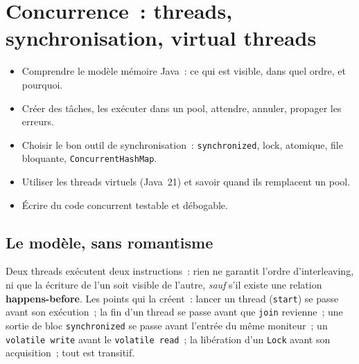 \chapter{Concurrence~: threads, synchronisation, virtual threads}
\label{ch-java-concurrency}

\begin{objectif}
\begin{itemize}
  \item Comprendre le mod\`ele m\'emoire Java~: ce qui est visible, dans quel ordre, et pourquoi.
  \item Cr\'eer des t\^aches, les ex\'ecuter dans un pool, attendre, annuler, propager les erreurs.
  \item Choisir le bon outil de synchronisation~: \texttt{synchronized}, lock, atomique,
        file bloquante, \texttt{ConcurrentHashMap}.
  \item Utiliser les threads virtuels (Java~21) et savoir quand ils remplacent un pool.
  \item \'Ecrire du code concurrent testable et d\'ebogable.
\end{itemize}
\end{objectif}

\section{Le mod\`ele, sans romantisme}

Deux threads ex\'ecutent deux instructions~: rien ne garantit l'ordre d'interleaving, ni que la
\'ecriture de l'un soit visible de l'autre, \emph{sauf} s'il existe une relation
\textbf{happens-before}. Les points qui la cr\'eent~: lancer un thread (\verb|start|) se passe
avant son ex\'ecution~; la fin d'un thread se passe avant que \verb|join| revienne~; une sortie de
bloc \verb|synchronized| se passe avant l'entr\'ee du m\^eme moniteur~; un \verb|volatile write| avant
le \verb|volatile read|~; la lib\'eration d'un \verb|Lock| avant son acquisition~; tout est transitif.

